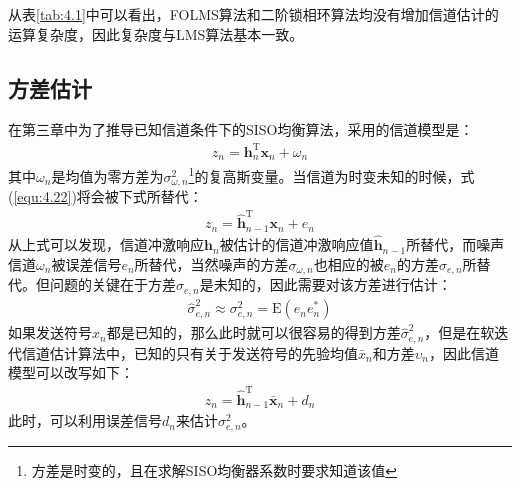 从表\ref{tab:4.1}中可以看出，FOLMS算法和二阶锁相环算法均没有增加信道估计的运算复杂度，因此复杂度与LMS算法基本一致。
\subsection{方差估计}
在第三章中为了推导已知信道条件下的SISO均衡算法，采用的信道模型是：
\begin{eqnarray}
    z_n=\mathbf{h}_n^{\mathrm{T}}\mathbf{x}_n+\omega_n
    \label{equ:4.22}
\end{eqnarray}
其中$\omega_n$是均值为零方差为$\sigma_{\omega,n}^2$\footnote{方差是时变的，且在求解SISO均衡器系数时要求知道该值}的复高斯变量。当信道为时变未知的时候，式(\ref{equ:4.22})将会被下式所替代：
\begin{eqnarray}
    z_n=\hat{\mathbf{h}}_{n-1}^{\mathrm{T}}\mathbf{x}_n+e_n
    \label{equ:4.23}
\end{eqnarray}
从上式可以发现，信道冲激响应$\mathbf{h}_n$被估计的信道冲激响应值$\hat{\mathbf{h}}_{n-1}$所替代，而噪声信道$\omega_n$被误差信号$e_n$所替代，当然噪声的方差$\sigma_{\omega,n}$也相应的被$e_n$的方差$\sigma_{e,n}$所替代。但问题的关键在于方差$\sigma_{e,n}$是未知的，因此需要对该方差进行估计：
\begin{eqnarray}
    \hat{\sigma}_{e,n}^2\approx\sigma_{e,n}^2=\mathrm{E}(e_ne_n^*)
    \label{equ:4.24}
\end{eqnarray}
如果发送符号$x_n$都是已知的，那么此时就可以很容易的得到方差$\hat{\sigma}_{e,n}^2$，但是在软迭代信道估计算法中，已知的只有关于发送符号的先验均值$\bar{x}_n$和方差$\upsilon_n$，因此信道模型可以改写如下：
\begin{eqnarray}
    z_n=\hat{\mathbf{h}}_{n-1}^{\mathrm{T}}\bar{\mathbf{x}}_n+d_n
    \label{equ:4.25}
\end{eqnarray}
此时，可以利用误差信号$d_n$来估计$\sigma_{e,n}^2$。

